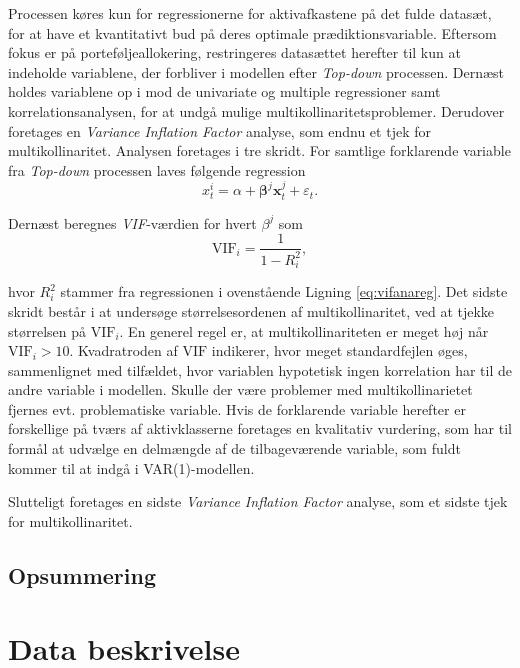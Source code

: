 \documentclass[
  a4paper,
  oneside]{memoir}
\begin{document}
Processen køres kun for regressionerne for aktivafkastene på det fulde datasæt, for at have et kvantitativt bud på deres optimale prædiktionsvariable. Eftersom fokus er på porteføljeallokering, restringeres datasættet herefter til kun at indeholde variablene, der forbliver i modellen efter \emph{Top-down} processen. Dernæst holdes variablene op i mod de univariate og multiple regressioner samt korrelationsanalysen, for at undgå mulige multikollinaritetsproblemer. Derudover foretages en \emph{Variance Inflation Factor} analyse, som endnu et tjek for multikollinaritet. Analysen foretages i tre skridt. For samtlige forklarende variable fra \emph{Top-down} processen laves følgende regression
\begin{equation}
x_t^i=\alpha+\bm{\beta}^j\bm{x}_t^{j}+\varepsilon_t. \label{eq:vifanareg}
\end{equation}

Dernæst beregnes \emph{VIF}-værdien for hvert \(\beta^j\) som
\[\text{VIF}_i=\frac{1}{1-R_i^2},\]

hvor \(R_i^2\) stammer fra regressionen i ovenstående Ligning \eqref{eq:vifanareg}. Det sidste skridt består i at undersøge størrelsesordenen af multikollinaritet, ved at tjekke størrelsen på \(\text{VIF}_i\). En generel regel er, at multikollinariteten er meget høj når \(\text{VIF}_i>10\). Kvadratroden af \(\text{VIF}\) indikerer, hvor meget standardfejlen øges, sammenlignet med tilfældet, hvor variablen hypotetisk ingen korrelation har til de andre variable i modellen. Skulle der være problemer med multikollinarietet fjernes evt. problematiske variable. Hvis de forklarende variable herefter er forskellige på tværs af aktivklasserne foretages en kvalitativ vurdering, som har til formål at udvælge en delmængde af de tilbageværende variable, som fuldt kommer til at indgå i VAR(1)-modellen.

Slutteligt foretages en sidste \emph{Variance Inflation Factor} analyse, som et sidste tjek for multikollinaritet.

\hypertarget{opsummering-2}{%
\section{Opsummering}\label{opsummering-2}}

\hypertarget{kapiteldatab}{%
\chapter{Data beskrivelse}\label{kapiteldatab}}
\end{document}
